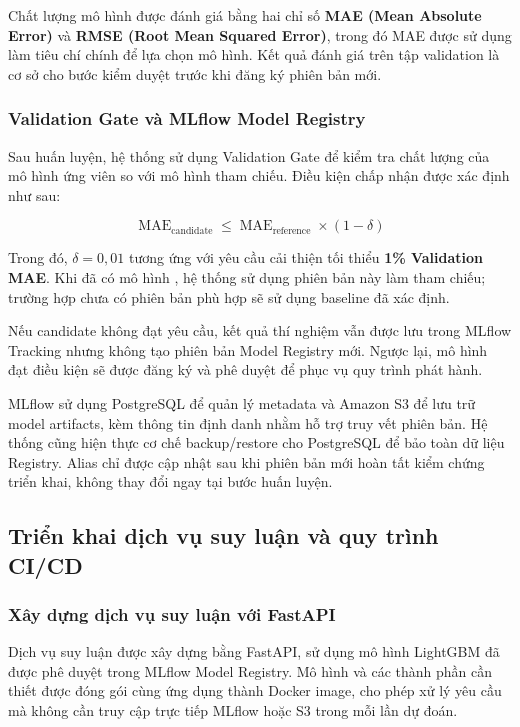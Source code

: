 Chất lượng mô hình được đánh giá bằng hai chỉ số \textbf{MAE (Mean Absolute Error)} và \textbf{RMSE (Root Mean Squared Error)}, trong đó MAE được sử dụng làm tiêu chí chính để lựa chọn mô hình. Kết quả đánh giá trên tập validation là cơ sở cho bước kiểm duyệt trước khi đăng ký phiên bản mới.


\subsubsection{Validation Gate và MLflow Model Registry}


Sau huấn luyện, hệ thống sử dụng Validation Gate để kiểm tra chất lượng của mô hình ứng viên so với mô hình tham chiếu. Điều kiện chấp nhận được xác định như sau:


\begin{equation}
\operatorname{MAE}_{\text{candidate}} \leq \operatorname{MAE}_{\text{reference}}\times(1-\delta)
\label{eq:validation-gate}\end{equation}

Trong đó, \(\delta=0{,}01\) tương ứng với yêu cầu cải thiện tối thiểu \textbf{1\% Validation MAE}. Khi đã có mô hình , hệ thống sử dụng phiên bản này làm tham chiếu; trường hợp chưa có phiên bản phù hợp sẽ sử dụng baseline đã xác định.


Nếu candidate không đạt yêu cầu, kết quả thí nghiệm vẫn được lưu trong MLflow Tracking nhưng không tạo phiên bản Model Registry mới. Ngược lại, mô hình đạt điều kiện sẽ được đăng ký và phê duyệt để phục vụ quy trình phát hành.


MLflow sử dụng PostgreSQL để quản lý metadata và Amazon S3 để lưu trữ model artifacts, kèm thông tin định danh nhằm hỗ trợ truy vết phiên bản. Hệ thống cũng hiện thực cơ chế backup/restore cho PostgreSQL để bảo toàn dữ liệu Registry. Alias  chỉ được cập nhật sau khi phiên bản mới hoàn tất kiểm chứng triển khai, không thay đổi ngay tại bước huấn luyện.


\subsection{Triển khai dịch vụ suy luận và quy trình CI/CD}


\subsubsection{Xây dựng dịch vụ suy luận với FastAPI}


Dịch vụ suy luận được xây dựng bằng FastAPI, sử dụng mô hình LightGBM đã được phê duyệt trong MLflow Model Registry. Mô hình và các thành phần cần thiết được đóng gói cùng ứng dụng thành Docker image, cho phép xử lý yêu cầu mà không cần truy cập trực tiếp MLflow hoặc S3 trong mỗi lần dự đoán.


